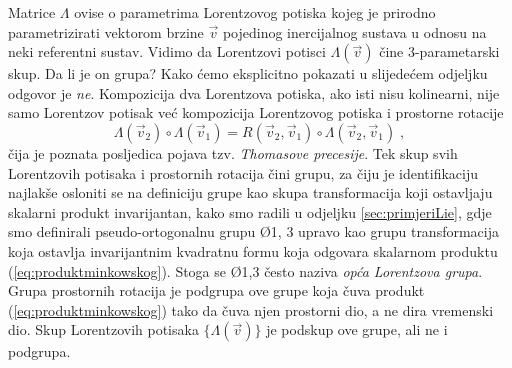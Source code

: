 Matrice $\Lambda$ ovise o parametrima Lorentzovog
potiska kojeg je prirodno parametrizirati vektorom brzine $\vec{v}$ pojedinog
inercijalnog sustava u odnosu na neki referentni sustav.
 Vidimo da Lorentzovi potisci $\Lambda(\vec{v})$ čine 3-parametarski
skup. Da li je on grupa? Kako ćemo eksplicitno pokazati u slijedećem
odjeljku odgovor je \emph{ne}. Kompozicija dva Lorentzova potiska, ako
isti nisu kolinearni, nije
samo Lorentzov potisak već kompozicija
Lorentzovog potiska i prostorne rotacije
\begin{equation}
 \Lambda(\vec{v}_2) \circ \Lambda(\vec{v}_1)
  = R(\vec{v}_2,\vec{v}_1) \circ \Lambda(\vec{v}_2,\vec{v}_1) \;,
\end{equation}
čija je  poznata posljedica pojava tzv. \emph{Thomasove precesije}.
Tek skup svih Lorentzovih potisaka
i prostornih rotacija čini grupu, za čiju je identifikaciju najlakše
osloniti se na definiciju grupe kao skupa transformacija koji
ostavljaju skalarni produkt invarijantan, kako smo radili
u odjeljku \ref{sec:primjeriLie}, gdje smo definirali
pseudo-ortogonalnu grupu \O{1, 3} upravo kao grupu transformacija
koja ostavlja invarijantnim kvadratnu formu koja
odgovara skalarnom produktu (\ref{eq:produktminkowskog}).
Stoga se \O{1,3} često naziva \emph{opća Lorentzova grupa}.
Grupa prostornih rotacija 
je podgrupa ove grupe koja čuva produkt (\ref{eq:produktminkowskog}) tako
da čuva njen prostorni dio, a ne dira vremenski dio. Skup Lorentzovih
potisaka $\{\Lambda(\vec{v})\}$ je podskup ove grupe, ali ne i podgrupa.

